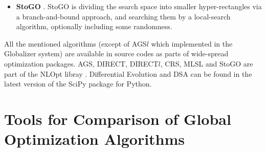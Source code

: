 \documentclass{svproc}
\begin{document}
\begin{itemize}
  \item \textbf{StoGO} \cite{Madsen1998}. StoGO is dividing the search space into smaller hyper-rectangles via a branch-and-bound approach,
  and searching them by a local-search algorithm, optionally including some randomness.

\end{itemize}

All the mentioned algorithms (except of AGS\(l\) which implemented in the Globalizer system)
are available in source codes as parts of wide-spread optimization packages.
AGS, DIRECT, DIRECT$l$, CRS, MLSL and StoGO are part of the NLOpt libray \cite{nlopt}. Differential Evolution and DSA can be found in
the latest version of the SciPy \cite{scipy} package for Python.

\section{Tools for Comparison of Global Optimization Algorithms}
\end{document}
